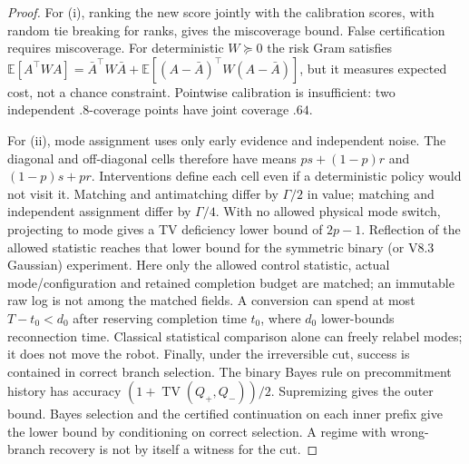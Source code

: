 \documentclass[11pt]{article}
\DeclareMathOperator{\TV}{TV}
\newcommand{\E}{\mathbb E}
\begin{document}
\begin{proof}
For (i), ranking the new score jointly with the calibration scores, with
random tie breaking for ranks, gives the miscoverage bound. False
certification requires miscoverage. For deterministic $W\succeq0$ the risk
Gram satisfies $\E[A^\top W A]=\bar A^\top W\bar A+
\E[(A-\bar A)^\top W(A-\bar A)]$, but it measures expected cost, not a
chance constraint. Pointwise calibration is insufficient: two independent
$.8$-coverage points have joint coverage $.64$.

For (ii), mode assignment uses only early evidence and independent noise.
The diagonal and off-diagonal cells therefore have means $ps+(1-p)r$ and
$(1-p)s+pr$. Interventions define each cell even if a deterministic policy
would not visit it. Matching and antimatching differ by $\Gamma/2$ in value;
matching and independent assignment differ by $\Gamma/4$. With no allowed
physical mode switch, projecting to mode gives a TV deficiency lower bound
of $2p-1$. Reflection of the allowed statistic reaches that lower bound for
the symmetric binary (or V8.3 Gaussian) experiment.
Here only the allowed control statistic, actual mode/configuration and
retained completion budget are matched; an immutable raw log is not among
the matched fields. A conversion can spend at most $T-t_0<d_0$ after
reserving completion time $t_0$, where $d_0$ lower-bounds reconnection time.
Classical statistical comparison alone can freely relabel modes; it does
not move the robot.
Finally, under the irreversible cut, success is contained in correct branch
selection. The binary Bayes rule on precommitment history has accuracy
$(1+\TV(Q_+,Q_-))/2$. Supremizing gives the outer bound. Bayes selection and
the certified continuation on each inner prefix give the lower bound by
conditioning on correct selection. A regime with wrong-branch recovery is
not by itself a witness for the cut.
\end{proof}
\end{document}
